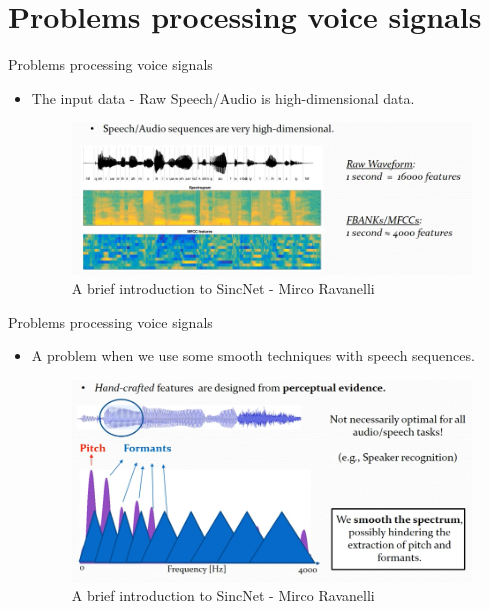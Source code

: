 \documentclass[11pt]{beamer}
\begin{document}
\section{Problems processing voice signals}
\begin{frame}{Problems processing voice signals}
	\begin{itemize}
		\item The input data - Raw Speech/Audio is high-dimensional data.
		\begin{figure}[H]
			\includegraphics[width=1\linewidth]{images/capture_01.png}
			\caption{A brief introduction to SincNet - Mirco Ravanelli}
			\label{fig:writing-thesis}
		\end{figure}
	\end{itemize}
\end{frame}
\begin{frame}{Problems processing voice signals}
	\begin{itemize}
		\item A problem when we use some smooth techniques with speech sequences.
		\begin{figure}[H]
			\includegraphics[width=1\linewidth]{images/perceptual_evidence.png}
			\caption{A brief introduction to SincNet - Mirco Ravanelli}
			\label{fig:writing-thesis}
		\end{figure}
	\end{itemize}
\end{frame}
\end{document}
